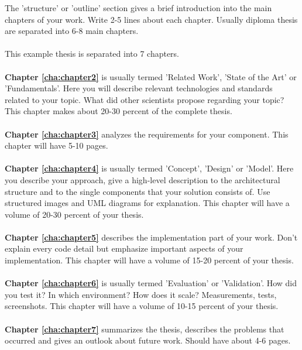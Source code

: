 The 'structure' or 'outline' section gives a brief introduction into the main chapters of your work. Write 2-5 lines about each chapter. Usually diploma thesis are separated into 6-8 main chapters. 
\\
\\
\noindent This example thesis is separated into 7 chapters.
\\
\\
\textbf{Chapter \ref{cha:chapter2}} is usually termed 'Related Work', 'State of the Art' or 'Fundamentals'. Here you will describe relevant technologies and standards related to your topic. What did other scientists propose regarding your topic? This chapter makes about 20-30 percent of the complete thesis.
\\
\\
\textbf{Chapter \ref{cha:chapter3}} analyzes the requirements for your component. This chapter will have 5-10 pages.
\\
\\
\textbf{Chapter \ref{cha:chapter4}} is usually termed 'Concept', 'Design' or 'Model'. Here you describe your approach, give a high-level description to the architectural structure and to the single components that your solution consists of. Use structured images and UML diagrams for explanation. This chapter will have a volume of 20-30 percent of your thesis.
\\
\\
\textbf{Chapter \ref{cha:chapter5}} describes the implementation part of your work. Don't explain every code detail but emphasize important aspects of your implementation. This chapter will have a volume of 15-20 percent of your thesis.
\\
\\
\textbf{Chapter \ref{cha:chapter6}} is usually termed 'Evaluation' or 'Validation'. How did you test it? In which environment? How does it scale? Measurements, tests, screenshots. This chapter will have a volume of 10-15 percent of your thesis.
\\
\\
\textbf{Chapter \ref{cha:chapter7}} summarizes the thesis, describes the problems that occurred and gives an outlook about future work. Should have about 4-6 pages.